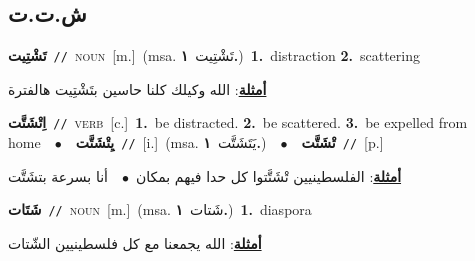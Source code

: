 \documentclass[10pt,a4paper,twoside]{article} %
\begin{document}
\begin{multicols}{2}
{{{{{{{{{{{{\vspace{-3mm}
\subsection*{\color{blue}\foreignlanguage{arabic}{ش.ت.ت}\color{blue}{}} 

{\setlength\topsep{0pt}\textbf{\foreignlanguage{arabic}{تَشْتِيت}}\ {\color{gray}\texttt{//}\color{black}}\ \textsc{noun}\ [m.]\ \color{gray}(msa. \foreignlanguage{arabic}{تَشْتِيت}~\foreignlanguage{arabic}{\textbf{١.}})\color{black}\ \textbf{1.}~distraction  \textbf{2.}~scattering\  \begin{flushright}\color{gray}\foreignlanguage{arabic}{\textbf{\underline{\foreignlanguage{arabic}{أمثلة}}}: الله وكيلك كلنا حاسين بتَشْتِيت هالفترة}\end{flushright}\color{black}} \vspace{2mm}

{\setlength\topsep{0pt}\textbf{\foreignlanguage{arabic}{اِتْشَتَّت}}\ {\color{gray}\texttt{//}\color{black}}\ \textsc{verb}\ [c.]\ \textbf{1.}~be distracted.  \textbf{2.}~be scattered.  \textbf{3.}~be expelled from home\ \ $\bullet$\ \ \setlength\topsep{0pt}\textbf{\foreignlanguage{arabic}{يِتْشَتَّت}}\ {\color{gray}\texttt{//}\color{black}}\ [i.]\ \color{gray}(msa. \foreignlanguage{arabic}{يَتَشَتَّت}~\foreignlanguage{arabic}{\textbf{١.}})\color{black}\ \ $\bullet$\ \ \setlength\topsep{0pt}\textbf{\foreignlanguage{arabic}{تْشَتَّت}}\ {\color{gray}\texttt{//}\color{black}}\ [p.]\  \begin{flushright}\color{gray}\foreignlanguage{arabic}{\textbf{\underline{\foreignlanguage{arabic}{أمثلة}}}: الفلسطينيين تْشَتَّتوا كل حدا فيهم بمكان\ $\bullet$\ \  أنا بسرعة بتشَتَّت}\end{flushright}\color{black}} \vspace{2mm}

{\setlength\topsep{0pt}\textbf{\foreignlanguage{arabic}{شَتَات}}\ {\color{gray}\texttt{//}\color{black}}\ \textsc{noun}\ [m.]\ \color{gray}(msa. \foreignlanguage{arabic}{شَتات}~\foreignlanguage{arabic}{\textbf{١.}})\color{black}\ \textbf{1.}~diaspora\  \begin{flushright}\color{gray}\foreignlanguage{arabic}{\textbf{\underline{\foreignlanguage{arabic}{أمثلة}}}: الله يجمعنا مع كل فلسطينيين الشّتات}\end{flushright}\color{black}} \vspace{2mm}

}}}}}}}}}}}}
\end{multicols}
\end{document}
